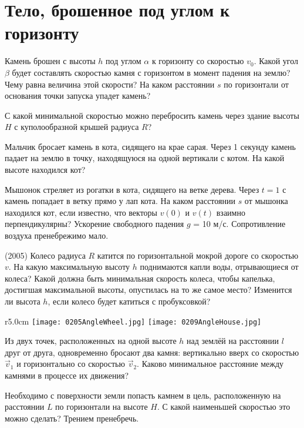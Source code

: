 \section{Тело, брошенное под углом к горизонту}

\AddProb Камень брошен с высоты $h$ под углом $\alpha$ к горизонту  со скоростью $v_0$. 
Какой угол $\beta$ будет составлять скоростью камня с горизонтом в момент падения на землю? Чему равна величина этой скорости? На каком расстоянии $s$ по горизонтали от основания точки запуска упадет камень? 

\AddProb С какой минимальной скоростью можно перебросить камень через здание высоты $H$ с куполообразной крышей радиуса $R$?

\AddProb Мальчик бросает камень в кота, сидящего на крае сарая. 
Через 1 секунду камень падает на землю в точку, находящуюся на одной вертикали с котом. 
На какой высоте находился кот?

\AddProb Мышонок стреляет из рогатки в кота, сидящего на ветке дерева. Через $t = 1$ с камень попадает в ветку прямо у лап кота. 
На каком расстоянии $s$ от мышонка находился кот, если известно, что векторы $v(0)$ и $v(t)$ взаимно перпендикулярны? 
Ускорение свободного падения $g$ = 10 м/с. Сопротивление воздуха пренебрежимо мало.

\AddProb (2005) Колесо радиуса $R$ катится по горизонтальной мокрой дороге со скоростью $v$. 
На какую максимальную высоту $h$ поднимаются капли воды, отрывающиеся от колеса? 
Какой должна быть минимальная скорость колеса, чтобы капелька, достигшая максимальной высоты, опустилась на то же самое место? 
Изменится ли высота $h$, если колесо будет катиться с пробуксовкой?

\begin{wrapfigure}{r}{5.0cm}
\texttt{[image: 0205AngleWheel.jpg]}
\texttt{[image: 0209AngleHouse.jpg]}
\end{wrapfigure}

\AddProb Из двух точек, расположенных на одной высоте $h$ над землёй на расстоянии $l$ друг от друга, 
одновременно бросают два камня: вертикально вверх со скоростью $\vec{v}_1$ и горизонтально со скоростью $\vec{v}_2$. 
Каково минимальное расстояние между камнями в процессе их движения?

\AddProb Необходимо с поверхности земли попасть камнем в цель, расположенную на расстоянии $L$ по горизонтали на высоте $H$. 
С какой наименьшей скоростью это можно сделать? Трением пренебречь.

